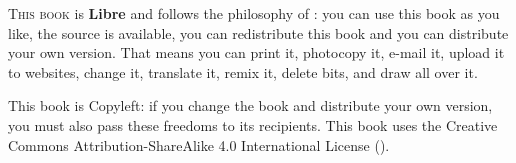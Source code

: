 \lettrine[lraise=-0.03,loversize=0.08]{T}{his book} is \textbf{Libre} and follows the philosophy of
:
you can use this book as you like, the source is available, you can redistribute
this book and you can distribute your own version. That means you can print it,
photocopy it, e-mail it, upload it to websites, change it, translate it, remix it, delete bits,
and draw all over it.

This book is Copyleft: if you change the book and distribute your own version, you must also pass these freedoms to its recipients.
This book uses the Creative Commons Attribution-ShareAlike 4.0 International License
(\href{http://creativecommons.org/licenses/by-sa/4.0/}{}).